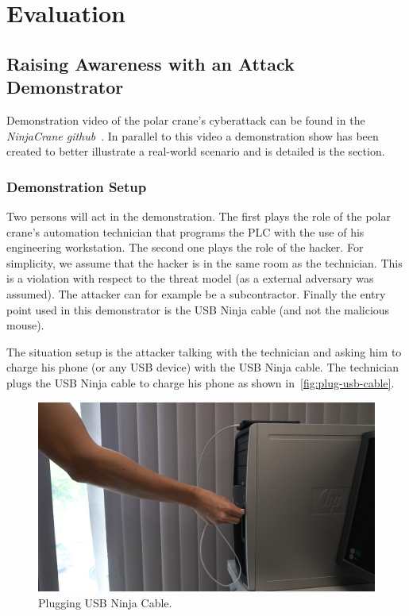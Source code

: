 \chapter{Evaluation}
\label{chapter:evaluation}

\section{Raising Awareness with an Attack Demonstrator}

Demonstration video of the polar crane's cyberattack can be found in the \emph{NinjaCrane github}~\cite{MyGithub}. In parallel to this video a demonstration show has been created to better illustrate a real-world scenario and is detailed is the section.

\subsection{Demonstration Setup}

Two persons will act in the demonstration. The first plays the role of the polar crane's automation technician that programs the PLC with the use of his engineering workstation. The second one plays the role of the hacker. For simplicity, we assume that the hacker is in the same room as the technician. This is a violation with respect to the threat model (as a external adversary was assumed). The attacker can for example be a subcontractor. Finally the entry point used in this demonstrator is the USB Ninja cable (and not the malicious mouse).

The situation setup is the attacker talking with the technician and asking him to charge his phone (or any USB device) with the USB Ninja cable. The technician plugs the USB Ninja cable to charge his phone as shown in~\autoref{fig:plug-usb-cable}.

\begin{figure}[H]
    \centering
    \includegraphics[trim={12cm 0 5cm 0}, clip, width=0.6\linewidth]{figures/plug-cable.jpg}
    \caption{Plugging USB Ninja Cable.}
    \label{fig:plug-usb-cable}
\end{figure}


